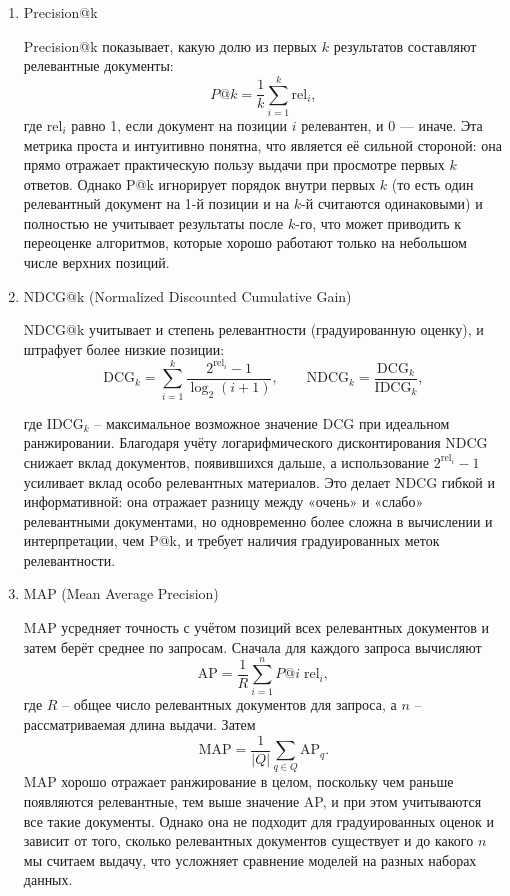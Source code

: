 \documentclass[14pt,a4paper,oneside,openany]{extbook}
\begin{document}
\begin{enumerate}
\item Precision@k

Precision@k показывает, какую долю из первых \(k\) результатов составляют релевантные документы:
$$
      P@k = \frac{1}{k}\sum_{i=1}^{k}\mathrm{rel}_i,
   $$
где \(\mathrm{rel}_i\) равно 1, если документ на позиции \(i\) релевантен, и 0 — иначе. Эта метрика проста и интуитивно понятна, что является её сильной стороной: она прямо отражает практическую пользу выдачи при просмотре первых \(k\) ответов. Однако P@k игнорирует порядок внутри первых \(k\) (то есть один релевантный документ на 1-й позиции и на \(k\)-й считаются одинаковыми) и полностью не учитывает результаты после \(k\)-го, что может приводить к переоценке алгоритмов, которые хорошо работают только на небольшом числе верхних позиций.

\item NDCG@k (Normalized Discounted Cumulative Gain)

NDCG@k учитывает и степень релевантности (градуированную оценку), и штрафует более низкие позиции:
$$
   \mathrm{DCG}_k = \sum_{i=1}^{k}\frac{2^{\mathrm{rel}_i}-1}{\log_2(i+1)},\qquad
   \mathrm{NDCG}_k = \frac{\mathrm{DCG}_k}{\mathrm{IDCG}_k},
   $$

где \(\mathrm{IDCG}_k\) -- максимальное возможное значение DCG при идеальном ранжировании. Благодаря учёту логарифмического дисконтирования NDCG снижает вклад документов, появившихся дальше, а использование \(2^{\mathrm{rel}_i}-1\) усиливает вклад особо релевантных материалов. Это делает NDCG гибкой и информативной: она отражает разницу между «очень» и «слабо» релевантными документами, но одновременно более сложна в вычислении и интерпретации, чем P@k, и требует наличия градуированных меток релевантности.

\item MAP (Mean Average Precision)

MAP усредняет точность с учётом позиций всех релевантных документов и затем берёт среднее по запросам. Сначала для каждого запроса вычисляют
$$
   \mathrm{AP}=\frac{1}{R}\sum_{i=1}^{n}P@i\;\mathrm{rel}_i,
   $$
где \(R\) -- общее число релевантных документов для запроса, а \(n\) -- рассматриваемая длина выдачи. Затем
$$
   \mathrm{MAP} = \frac{1}{|Q|}\sum_{q\in Q}\mathrm{AP}_q.
   $$
MAP хорошо отражает ранжирование в целом, поскольку чем раньше появляются релевантные, тем выше значение AP, и при этом учитываются все такие документы. Однако она не подходит для градуированных оценок и зависит от того, сколько релевантных документов существует и до какого \(n\) мы считаем выдачу, что усложняет сравнение моделей на разных наборах данных.


\end{enumerate}
\end{document}
